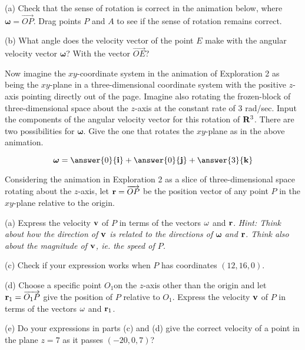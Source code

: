 \documentclass{ximera}
\begin{document}
\begin{exploration}

(a) Check that the sense of rotation is correct in the animation below, where $\boldsymbol{\omega} = \overrightarrow{OP}$. Drag points $P$ and $A$ to see if the sense of rotation remains correct.

(b) What angle does the velocity vector of the point $E$ make with the angular velocity vector $\boldsymbol{\omega}$? With the vector ${\overrightarrow{OE}}$?


 
\begin{onlineOnly}
    \begin{center}
\end{center}
\end{onlineOnly}

\end{exploration}



Now imagine the $xy$-coordinate system in the animation of Exploration 2 as being the $xy$-plane in a three-dimensional coordinate system with the positive $z$-axis pointing directly out of the page. Imagine also rotating the frozen-block of three-dimensional space about the $z$-axis at the constant rate of $3$ rad/sec. Input the components of the angular velocity vector for this rotation of ${\bf R}^3$. There are two possibilities for $\boldsymbol{\omega}$. Give the one that rotates the $xy$-plane as in the above animation. 

\begin{question}  \label{Qhfnbyt:Cross}
\[
\boldsymbol{\omega} = \answer{0}{\bf i} + \answer{0}{\bf j} + \answer{3}{\bf k}
\]
\end{question}

\begin{question}  \label{Qnjy55:Cross}
Considering the animation in Exploration 2 as a slice of three-dimensional space rotating about the $z$-axis, let ${\bf r} = \overrightarrow{OP}$ be the position vector of any point $P$ in the $xy$-plane relative to the origin.

(a) Express the velocity ${\bf v}$ of $P$ in terms of the vectors ${\bf\omega}$ and ${\bf r}$. \it{Hint:} Think about how the direction of ${\bf v}$ is related to the directions of $\boldsymbol{\omega}$ and ${\bf r}$. Think also about the magnitude of ${\bf v}$, ie. the speed of $P$.

(c) Check if your expression works when $P$ has coordinates $(12, 16,0)$.

(d) Choose a specific point $O_1$on the $z$-axis other than the origin and let ${\bf r}_1 = \overrightarrow{O_1P}$ give the position of $P$ relative to $O_1$. Express the velocity ${\bf v}$ of $P$ in terms of the vectors ${\bf\omega}$ and ${\bf r}_1$. 


(e) Do your expressions in parts (c) and (d) give the correct velocity of a point in the plane $z=7$ as it passes $(-20,0,7)$?


\end{question}
\end{document}
